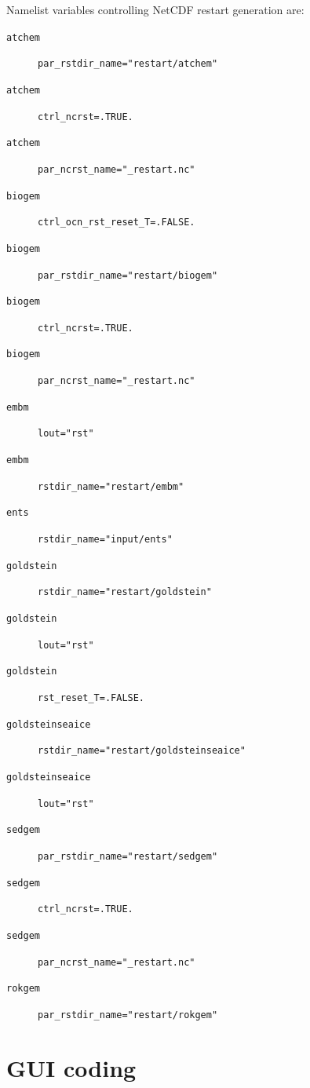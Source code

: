 \documentclass[a4paper,11pt,article]{memoir}
\begin{document}
Namelist variables controlling NetCDF restart generation are:
\begin{description}
  \item[\texttt{atchem}]{\texttt{par\_rstdir\_name="restart/atchem"}}
  \item[\texttt{atchem}]{\texttt{ctrl\_ncrst=.TRUE.}}
  \item[\texttt{atchem}]{\texttt{par\_ncrst\_name="\_restart.nc"}}

  \item[\texttt{biogem}]{\texttt{ctrl\_ocn\_rst\_reset\_T=.FALSE.}}
  \item[\texttt{biogem}]{\texttt{par\_rstdir\_name="restart/biogem"}}
  \item[\texttt{biogem}]{\texttt{ctrl\_ncrst=.TRUE.}}
  \item[\texttt{biogem}]{\texttt{par\_ncrst\_name="\_restart.nc"}}

  \item[\texttt{embm}]{\texttt{lout="rst"}}
  \item[\texttt{embm}]{\texttt{rstdir\_name="restart/embm"}}

  \item[\texttt{ents}]{\texttt{rstdir\_name="input/ents"}}

  \item[\texttt{goldstein}]{\texttt{rstdir\_name="restart/goldstein"}}
  \item[\texttt{goldstein}]{\texttt{lout="rst"}}
  \item[\texttt{goldstein}]{\texttt{rst\_reset\_T=.FALSE.}}

  \item[\texttt{goldsteinseaice}]{\texttt{rstdir\_name="restart/goldsteinseaice"}}
  \item[\texttt{goldsteinseaice}]{\texttt{lout="rst"}}

  \item[\texttt{sedgem}]{\texttt{par\_rstdir\_name="restart/sedgem"}}
  \item[\texttt{sedgem}]{\texttt{ctrl\_ncrst=.TRUE.}}
  \item[\texttt{sedgem}]{\texttt{par\_ncrst\_name="\_restart.nc"}}

  \item[\texttt{rokgem}]{\texttt{par\_rstdir\_name="restart/rokgem"}}
\end{description}

\newpage
\chapter{GUI coding}
\end{document}
